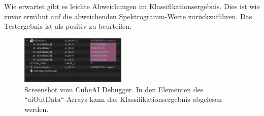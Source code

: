 \begin{adjustwidth}{0.5cm}{0cm}
Wie erwartet gibt es leichte Abweichungen im Klassifikationsergebnis. Dies ist wie zuvor erwähnt auf die abweichenden Spektrogramm-Werte zurückzuführen. Das Testergebnis ist als positiv zu beurteilen. 

\begin{figure}[h!]
\centering
\includegraphics[width=0.45\textwidth]{images/10_test_validierung/nn/nn-debuger-classification-result.png}
\caption{Screenshot vom CubeAI Debugger. In den Elementen des ``aiOutData``-Arrays kann das Klassifikationsergebnis abgelesen werden.}
\label{fig:img-stm-classification-result}
\end{figure}

\end{adjustwidth}

